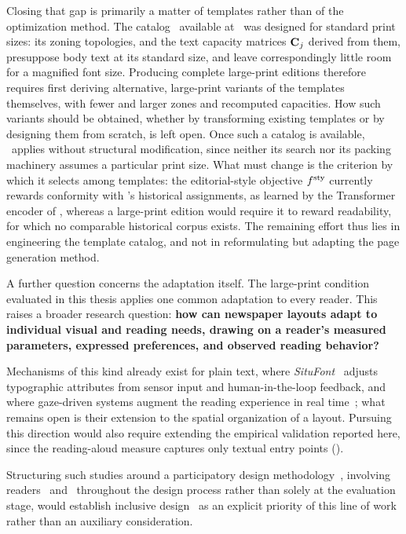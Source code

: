 Closing that gap is primarily a matter of templates rather than of the optimization method. The catalog \templatecatalog\ available at \melody\ was designed for standard print sizes: its zoning topologies, and the text capacity matrices $\mathbf{C}_{j}$ derived from them, presuppose body text at its standard size, and leave correspondingly little room for a magnified font size. Producing complete large-print editions therefore requires first deriving alternative, large-print variants of the templates themselves, with fewer and larger zones and recomputed capacities. How such variants should be obtained, whether by transforming existing templates or by designing them from scratch, is left open. 
Once such a catalog is available, \methodNameGeneral\ applies without structural modification, since neither its search nor its packing machinery assumes a particular print size. What must change is the criterion by which it selects among templates: the editorial-style objective $f^{\textrm{sty}}$ currently rewards conformity with \melody's historical assignments, as learned by the Transformer encoder of \neuralmethod, whereas a large-print edition would require it to reward readability, for which no comparable historical corpus exists. The remaining effort thus lies in engineering the template catalog, and not in reformulating but adapting the page generation method.

A further question concerns the adaptation itself. The large-print condition evaluated in this thesis applies one common adaptation to every reader. This raises a broader research question: \textbf{how can newspaper layouts adapt to individual visual and reading needs, drawing on a reader's measured parameters, expressed preferences, and observed reading behavior?}

Mechanisms of this kind already exist for plain text, where \emph{SituFont}~\cite{yue2024situfont} adjusts typographic attributes from sensor input and human-in-the-loop feedback, and where gaze-driven systems augment the reading experience in real time~\cite{aguilar-castet2017, wang_gazeprompt_2024}; what remains open is their extension to the spatial organization of a layout. 
Pursuing this direction would also require extending the empirical validation reported here, since the reading-aloud measure captures only textual entry points ().

Structuring such studies around a participatory design methodology~\cite{schuler-participatory-design-1993, wacnik-participatory-review-2024}, involving readers \NV\ and \LV\ throughout the design process rather than solely at the evaluation stage, would establish inclusive design~\cite{langdon-inclusive-design-2014} as an explicit priority of this line of work rather than an auxiliary consideration.

